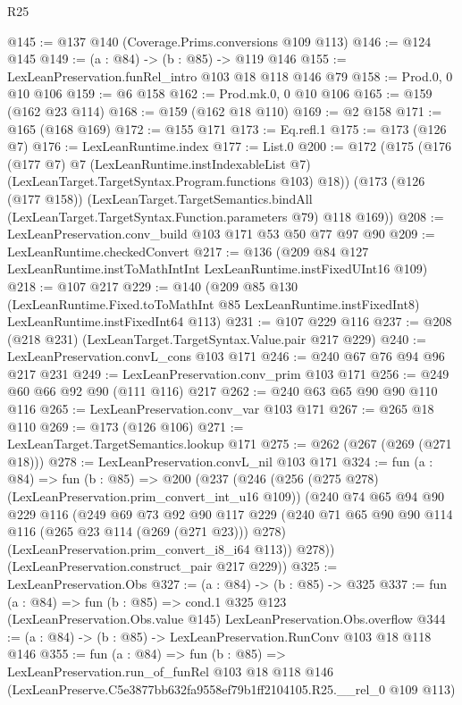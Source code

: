 \begin{lexlean}{R25}
\begin{coremodule}
@145 := @137 @140 (Coverage.Prims.conversions @109 @113)
@146 := @124 @145
@149 := (a : @84) -> (b : @85) -> @119 @146
@155 := LexLeanPreservation.funRel_intro @103 @18 @118 @146 @79
@158 := Prod.{0, 0} @10 @106
@159 := @6 @158
@162 := Prod.mk.{0, 0} @10 @106
@165 := @159 (@162 @23 @114)
@168 := @159 (@162 @18 @110)
@169 := @2 @158
@171 := @165 (@168 @169)
@172 := @155 @171
@173 := Eq.refl.{1}
@175 := @173 (@126 @7)
@176 := LexLeanRuntime.index
@177 := List.{0}
@200 := @172
    (@175
      (@176
        (@177 @7)
        @7
        (LexLeanRuntime.instIndexableList @7)
        (LexLeanTarget.TargetSyntax.Program.functions @103)
        @18))
    (@173
      (@126 (@177 @158))
      (LexLeanTarget.TargetSemantics.bindAll
        (LexLeanTarget.TargetSyntax.Function.parameters @79)
        @118
        @169))
@208 := LexLeanPreservation.conv_build @103 @171 @53 @50 @77 @97 @90
@209 := LexLeanRuntime.checkedConvert
@217 := @136 (@209 @84 @127 LexLeanRuntime.instToMathIntInt LexLeanRuntime.instFixedUInt16 @109)
@218 := @107 @217
@229 := @140
    (@209
      @85
      @130
      (LexLeanRuntime.Fixed.toToMathInt @85 LexLeanRuntime.instFixedInt8)
      LexLeanRuntime.instFixedInt64
      @113)
@231 := @107 @229 @116
@237 := @208 (@218 @231) (LexLeanTarget.TargetSyntax.Value.pair @217 @229)
@240 := LexLeanPreservation.convL_cons @103 @171
@246 := @240 @67 @76 @94 @96 @217 @231
@249 := LexLeanPreservation.conv_prim @103 @171
@256 := @249 @60 @66 @92 @90 (@111 @116) @217
@262 := @240 @63 @65 @90 @90 @110 @116
@265 := LexLeanPreservation.conv_var @103 @171
@267 := @265 @18 @110
@269 := @173 (@126 @106)
@271 := LexLeanTarget.TargetSemantics.lookup @171
@275 := @262 (@267 (@269 (@271 @18)))
@278 := LexLeanPreservation.convL_nil @103 @171
@324 := fun (a : @84) =>
  fun (b : @85) =>
  @200
    (@237
      (@246
        (@256 (@275 @278) (LexLeanPreservation.prim_convert_int_u16 @109))
        (@240
          @74
          @65
          @94
          @90
          @229
          @116
          (@249
            @69
            @73
            @92
            @90
            @117
            @229
            (@240 @71 @65 @90 @90 @114 @116 (@265 @23 @114 (@269 (@271 @23))) @278)
            (LexLeanPreservation.prim_convert_i8_i64 @113))
          @278))
      (LexLeanPreservation.construct_pair @217 @229))
@325 := LexLeanPreservation.Obs
@327 := (a : @84) -> (b : @85) -> @325
@337 := fun (a : @84) =>
  fun (b : @85) =>
  cond.{1} @325 @123 (LexLeanPreservation.Obs.value @145) LexLeanPreservation.Obs.overflow
@344 := (a : @84) -> (b : @85) -> LexLeanPreservation.RunConv @103 @18 @118 @146
@355 := fun (a : @84) =>
  fun (b : @85) =>
  LexLeanPreservation.run_of_funRel
    @103
    @18
    @118
    @146
    (LexLeanPreserve.C5e3877bb632fa9558ef79b1ff2104105.R25.__rel_0 @109 @113)
\end{coremodule}
\end{lexlean}

